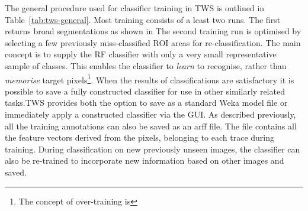 The general procedure used for classifier training in \ac{TWS} is outlined in Table~\ref{tab:tws-general}. Most training consists of a least two runs. The first returns broad segmentations as shown in  The second training run is optimised by selecting a few previously miss-classified ROI areas for re-classification. The main concept is to supply the \ac{RF} classifier with only a very small representative sample of classes. This enables the classifier to \emph{learn} to recognise, rather than \emph{memorise} target pixels\footnote{The concept of over-training is}. When the results of classifications are satisfactory it is possible to save a fully constructed classifier for use in other similarly related tasks.\ac{TWS} provides both the option to save as a standard Weka model file or immediately apply a constructed classifier via the \ac{GUI}. As described previously, all the training annotations can also be saved as an arff file. The file contains all the feature vectors derived from the pixels, belonging to each trace during training. During classification on new previously unseen images, the classifier can also be re-trained to incorporate new information based on other images and saved. 

